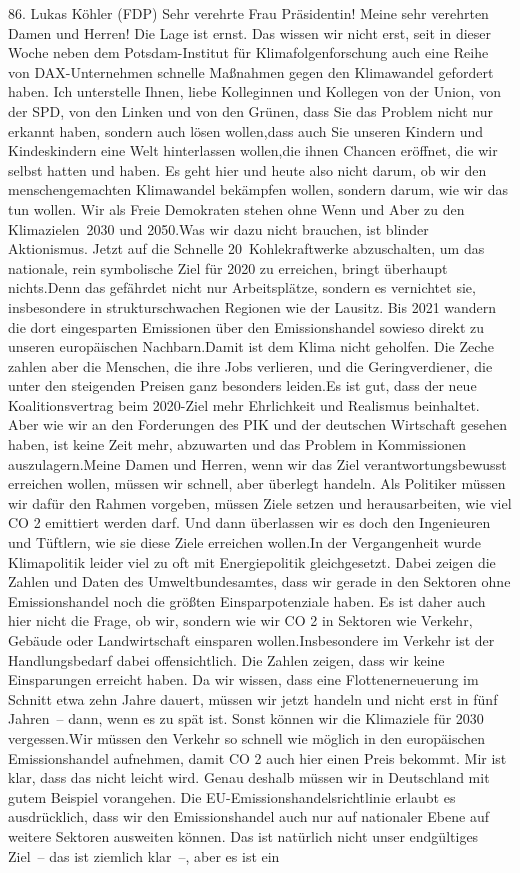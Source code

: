 \documentclass{article}
\begin{document}
	86. Lukas Köhler (FDP) Sehr verehrte Frau Präsidentin! Meine sehr verehrten Damen und Herren! Die Lage ist ernst. Das wissen wir nicht erst, seit in dieser Woche neben dem Potsdam-Institut für Klimafolgenforschung auch eine Reihe von DAX-Unternehmen schnelle Maßnahmen gegen den Klimawandel gefordert haben. Ich unterstelle Ihnen, liebe Kolleginnen und Kollegen von der Union, von der SPD, von den Linken und von den Grünen, dass Sie das Problem nicht nur erkannt haben, sondern auch lösen wollen,dass auch Sie unseren Kindern und Kindeskindern eine Welt hinterlassen wollen,die ihnen Chancen eröffnet, die wir selbst hatten und haben. Es geht hier und heute also nicht darum, ob wir den menschengemachten Klimawandel bekämpfen wollen, sondern darum, wie wir das tun wollen. Wir als Freie Demokraten stehen ohne Wenn und Aber zu den Klimazielen 2030 und 2050.Was wir dazu nicht brauchen, ist blinder Aktionismus. Jetzt auf die Schnelle 20 Kohlekraftwerke abzuschalten, um das nationale, rein symbolische Ziel für 2020 zu erreichen, bringt überhaupt nichts.Denn das gefährdet nicht nur Arbeitsplätze, sondern es vernichtet sie, insbesondere in strukturschwachen ­Regionen wie der Lausitz. Bis 2021 wandern die dort eingesparten Emissionen über den Emissionshandel sowieso direkt zu unseren europäischen Nachbarn.Damit ist dem Klima nicht geholfen. Die Zeche zahlen aber die Menschen, die ihre Jobs verlieren, und die Geringverdiener, die unter den steigenden Preisen ganz besonders leiden.Es ist gut, dass der neue Koalitionsvertrag beim 2020-Ziel mehr Ehrlichkeit und Realismus beinhaltet. Aber wie wir an den Forderungen des PIK und der deutschen Wirtschaft gesehen haben, ist keine Zeit mehr, abzuwarten und das Problem in Kommissionen auszulagern.Meine Damen und Herren, wenn wir das Ziel verantwortungsbewusst erreichen wollen, müssen wir schnell, aber überlegt handeln. Als Politiker müssen wir dafür den Rahmen vorgeben, müssen Ziele setzen und herausarbeiten, wie viel CO 2 emittiert werden darf. Und dann überlassen wir es doch den Ingenieuren und Tüftlern, wie sie diese Ziele erreichen wollen.In der Vergangenheit wurde Klimapolitik leider viel zu oft mit Energiepolitik gleichgesetzt. Dabei zeigen die Zahlen und Daten des Umweltbundesamtes, dass wir gerade in den Sektoren ohne Emissionshandel noch die größten Einsparpotenziale haben. Es ist daher auch hier nicht die Frage, ob wir, sondern wie wir CO 2 in Sektoren wie Verkehr, Gebäude oder Landwirtschaft einsparen wollen.Insbesondere im Verkehr ist der Handlungsbedarf dabei offensichtlich. Die Zahlen zeigen, dass wir keine Einsparungen erreicht haben. Da wir wissen, dass eine Flottenerneuerung im Schnitt etwa zehn Jahre dauert, müssen wir jetzt handeln und nicht erst in fünf Jahren – dann, wenn es zu spät ist. Sonst können wir die Klimaziele für 2030 vergessen.Wir müssen den Verkehr so schnell wie möglich in den europäischen Emissionshandel aufnehmen, damit CO 2 auch hier einen Preis bekommt. Mir ist klar, dass das nicht leicht wird. Genau deshalb müssen wir in Deutschland mit gutem Beispiel vorangehen. Die EU-Emissionshandelsrichtlinie erlaubt es ausdrücklich, dass wir den Emissionshandel auch nur auf nationaler Ebene auf weitere Sektoren ausweiten können. Das ist natürlich nicht unser endgültiges Ziel – das ist ziemlich klar –, aber es ist ein 
\end{document}

